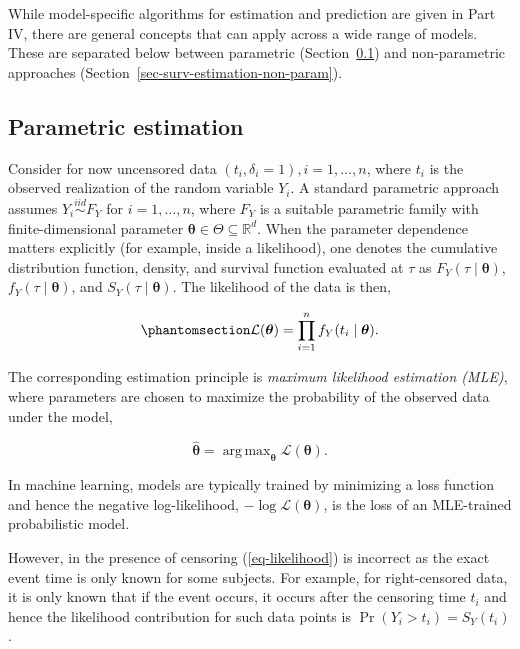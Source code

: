 \documentclass[
  letterpaper,
  krantz2]{style/krantz}
\begin{document}
While model-specific algorithms for estimation and prediction are given
in Part IV, there are general concepts that can apply across a wide
range of models. These are separated below between parametric
(Section~\ref{sec-surv-estimation-param}) and non-parametric approaches
(Section~\ref{sec-surv-estimation-non-param}).

\subsection{Parametric estimation}\label{sec-surv-estimation-param}

Consider for now uncensored data \((t_i, \delta_i=1), i=1,\ldots,n\),
where \(t_i\) is the observed realization of the random variable
\(Y_i\). A standard parametric approach
assumes \(Y_i \stackrel{iid}{\sim} F_Y\) for \(i=1,\ldots,n\), where
\(F_Y\) is a suitable parametric family with finite-dimensional
parameter \(\boldsymbol{\theta}\in \Theta \subseteq \mathbb{R}^d\). When
the parameter dependence matters explicitly (for example, inside a
likelihood), one denotes the cumulative distribution
function,
density, and survival
function evaluated at \(\tau\) as
\(F_Y(\tau\mid\boldsymbol{\theta})\),
\(f_Y(\tau\mid\boldsymbol{\theta})\), and
\(S_Y(\tau\mid\boldsymbol{\theta})\). The likelihood of the data is
then,

\begin{equation}\phantomsection\label{eq-likelihood}{
\mathcal{L}(\boldsymbol{\theta}) = \prod_{i=1}^{n}f_Y(t_i \mid \boldsymbol{\theta}).
}\end{equation}

The corresponding estimation principle is \emph{maximum likelihood
estimation (MLE)}, where parameters
are chosen to maximize the probability of the observed data under the
model,

\[
\hat{\boldsymbol{\theta}} = \mathop{\mathrm{arg\,max}}_{\boldsymbol{\theta}} \mathcal{L}(\boldsymbol{\theta}).
\]

In machine learning, models are typically
trained by minimizing a loss function and hence the
negative log-likelihood,
\(-\log \mathcal{L}(\boldsymbol{\theta})\), is the loss of an
MLE-trained probabilistic model.

However, in the presence of censoring (\ref{eq-likelihood}) is incorrect
as the exact event time is only known for some subjects. For example,
for right-censored data, it is only known that if the event occurs, it
occurs after the censoring time \(t_i\) and hence the likelihood
contribution for such data points is \(\Pr(Y_i > t_i) = S_Y(t_i)\).
\end{document}
